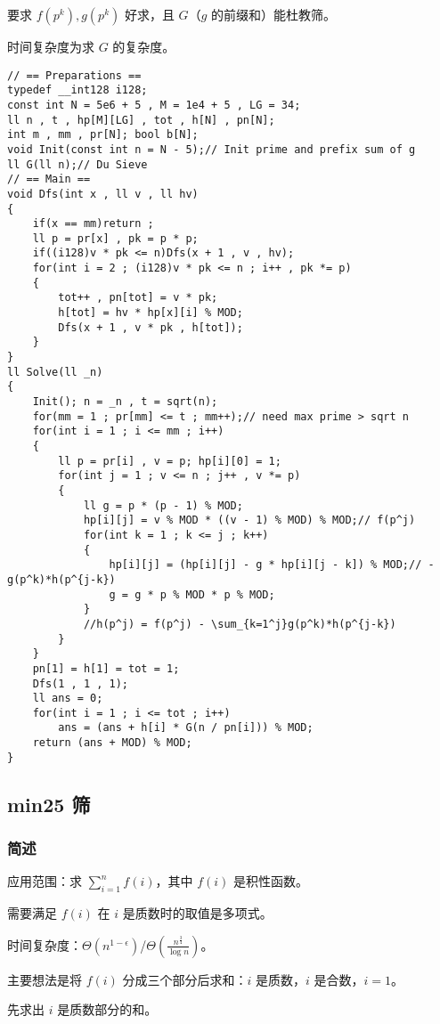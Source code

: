 要求 $f(p^k),g(p^k)$ 好求，且 $G$（$g$ 的前缀和）能杜教筛。

时间复杂度为求 $G$ 的复杂度。

\begin{verbatim}
// == Preparations ==
typedef __int128 i128;
const int N = 5e6 + 5 , M = 1e4 + 5 , LG = 34;
ll n , t , hp[M][LG] , tot , h[N] , pn[N];
int m , mm , pr[N]; bool b[N];
void Init(const int n = N - 5);// Init prime and prefix sum of g
ll G(ll n);// Du Sieve
// == Main ==
void Dfs(int x , ll v , ll hv)
{
    if(x == mm)return ;
    ll p = pr[x] , pk = p * p;
    if((i128)v * pk <= n)Dfs(x + 1 , v , hv);
    for(int i = 2 ; (i128)v * pk <= n ; i++ , pk *= p)
    {
        tot++ , pn[tot] = v * pk;
        h[tot] = hv * hp[x][i] % MOD;
        Dfs(x + 1 , v * pk , h[tot]);
    }
}
ll Solve(ll _n)
{
    Init(); n = _n , t = sqrt(n);
    for(mm = 1 ; pr[mm] <= t ; mm++);// need max prime > sqrt n
    for(int i = 1 ; i <= mm ; i++)
    {
        ll p = pr[i] , v = p; hp[i][0] = 1;
        for(int j = 1 ; v <= n ; j++ , v *= p)
        {
            ll g = p * (p - 1) % MOD; 
            hp[i][j] = v % MOD * ((v - 1) % MOD) % MOD;// f(p^j)
            for(int k = 1 ; k <= j ; k++)
            {
                hp[i][j] = (hp[i][j] - g * hp[i][j - k]) % MOD;// - g(p^k)*h(p^{j-k})
                g = g * p % MOD * p % MOD;
            }
            //h(p^j) = f(p^j) - \sum_{k=1^j}g(p^k)*h(p^{j-k})
        }
    }
    pn[1] = h[1] = tot = 1; 
    Dfs(1 , 1 , 1);
    ll ans = 0;
    for(int i = 1 ; i <= tot ; i++)
        ans = (ans + h[i] * G(n / pn[i])) % MOD;
    return (ans + MOD) % MOD;
}
\end{verbatim}

\subsection{min25 筛}

\subsubsection{简述}

应用范围：求 $\sum_{i=1}^n f(i)$，其中 $f(i)$ 是积性函数。

需要满足 $f(i)$ 在 $i$ 是质数时的取值是多项式。

时间复杂度：$\Theta(n^{1-\epsilon})$/$\Theta(\frac{n^{\frac{3}{4}}}{\log n})$。

主要想法是将 $f(i)$ 分成三个部分后求和：$i$ 是质数，$i$ 是合数，$i=1$。

先求出 $i$ 是质数部分的和。

